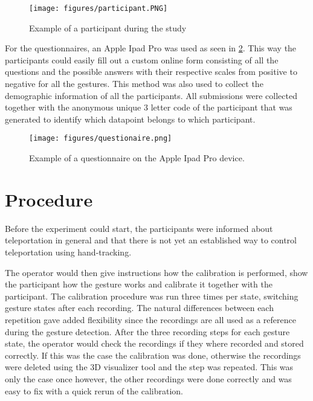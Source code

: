 \begin{figure}[!ht]
    \centering
    \texttt{[image: figures/participant.PNG]}
    \caption{Example of a participant during the study}
    \label{fig:video}
\end{figure}

For the questionnaires, an Apple Ipad Pro was used as seen in \ref{fig:Ipad}. This way the participants could easily fill out a custom online form consisting of all the questions and the possible answers with their respective scales from positive to negative for all the gestures. This method was also used to collect the demographic information of all the participants. All submissions were collected together with the anonymous unique 3 letter code of the participant that was generated to identify which datapoint belongs to which participant. 

\begin{figure}[!ht]
    \centering
    \texttt{[image: figures/questionaire.png]}
    \caption{Example of a questionnaire on the Apple Ipad Pro device.}
    \label{fig:Ipad}
\end{figure}

\section{Procedure}
Before the experiment could start, the participants were informed about teleportation in general and that there is not yet an established way to control teleportation using hand-tracking.

The operator would then give instructions how the calibration is performed, show the participant how the gesture works and calibrate it together with the participant. The calibration procedure was run three times per state, switching gesture states after each recording. The natural differences between each repetition gave added flexibility since the recordings are all used as a reference during the gesture detection. After the three recording steps for each gesture state, the operator would check the recordings if they where recorded and stored correctly. If this was the case the calibration was done, otherwise the recordings were deleted using the 3D visualizer tool and the step was repeated. This was only the case once however, the other recordings were done correctly and was easy to fix with a quick rerun of the calibration. 

